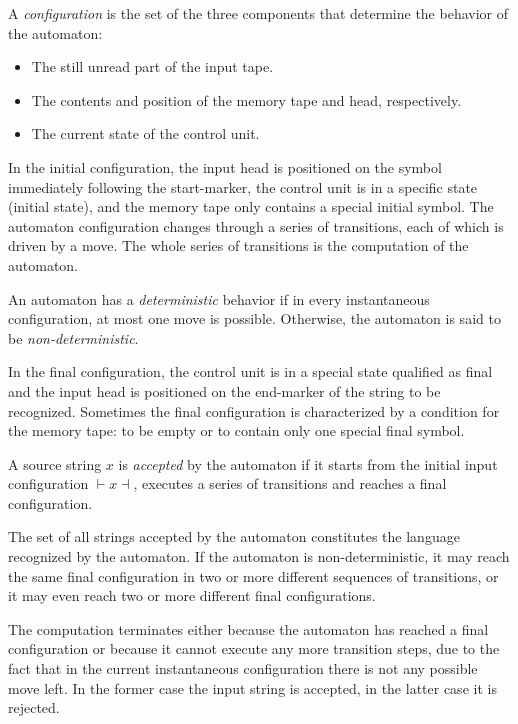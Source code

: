\begin{definition}
    A \emph{configuration}  is the set of the three components that determine the behavior of the automaton: 
    \begin{itemize}
        \item The still unread part of the input tape. 
        \item The contents and position of the memory tape and head, respectively. 
        \item The current state of the control unit.
    \end{itemize}
\end{definition}
In the initial configuration, the input head is positioned on the symbol immediately following the start-marker, the control unit is in a specific state (initial state), and the memory tape only contains a special initial symbol. 
The automaton configuration changes through a series of transitions, each of which is driven by a move. 
The whole series of transitions is the computation of the automaton.
\begin{definition}
    An automaton has a \emph{deterministic} behavior if in every instantaneous configuration, at most one move is possible. 
    Otherwise, the automaton is said to be \emph{non-deterministic}.
\end{definition}
In the final configuration, the control unit is in a special state qualified as final and the input head is positioned on the end-marker of the string to be recognized.
Sometimes the final configuration is characterized by a condition for the memory tape: to be empty or to contain only one special final symbol.

\begin{definition}
    A source string $x$ is \emph{accepted} by the automaton if it starts from the initial input configuration $\vdash x \dashv$, executes a series of transitions and reaches a final configuration.
\end{definition}
The set of all strings accepted by the automaton constitutes the language recognized by the automaton. 
If the automaton is non-deterministic, it may reach the same final configuration in two or more different sequences of transitions, or it may even reach two or more different final configurations. 

The computation terminates either because the automaton has reached a final configuration or because it cannot execute any more transition steps, due to the fact that in the current instantaneous configuration there is not any possible move left.
In the former case the input string is accepted, in the latter case it is rejected.

